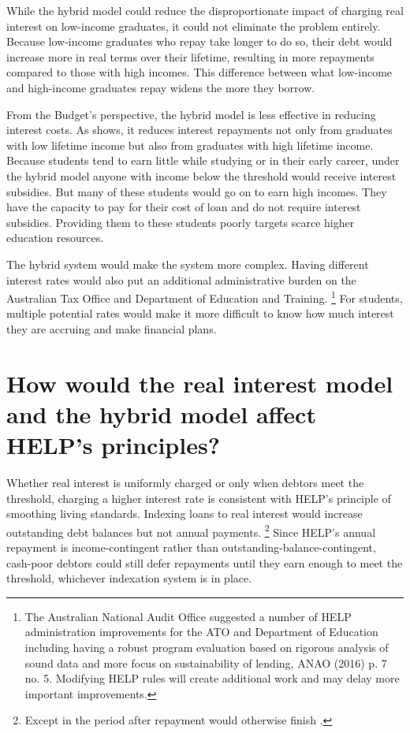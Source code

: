 \documentclass[embargoed]{grattan}
\begin{document}
While the hybrid model could reduce the disproportionate impact of charging real interest on low-income graduates, it could not eliminate the problem entirely.
Because low-income graduates who repay take longer to do so, their debt would increase more in real terms over their lifetime, resulting in more repayments compared to those with high incomes.
This difference between what low-income and high-income graduates repay widens the more they borrow.

From the Budget's perspective, the hybrid model is less effective in reducing interest costs.
As  shows, it reduces interest repayments not only from graduates with low lifetime income but also from graduates with high lifetime income.
Because students tend to earn little while studying or in their early career, under the hybrid model anyone with income below the threshold would receive interest subsidies.
But many of these students would go on to earn high incomes.
They have the capacity to pay for their cost of loan and do not require interest subsidies.
Providing them to these students poorly targets scarce higher education resources.

The hybrid system would make the system more complex.
Having different interest rates would also put an additional administrative burden on the Australian Tax Office and Department of Education and Training.%
\footnote{The Australian National Audit Office suggested a number of \gls{HELP} administration improvements for the \gls{ATO} and Department of Education including having a robust program evaluation based on rigorous analysis of sound data and more focus on sustainability of lending, ANAO (2016) p. 7 no. 5.
Modifying \gls{HELP} rules will create additional work and may delay more important improvements.} For students, multiple potential rates would make it more difficult to know how much interest they are accruing and make financial plans.

\section[How would the real interest model and the hybrid model affect {HELP}'s principles?]{How would the real interest model and the hybrid model affect \gls{HELP}'s principles?}\label{how-would-the-real-interest-model-and-the-hybrid-model-affect-helps-principles}

Whether real interest is uniformly charged or only when debtors meet the threshold, charging a higher interest rate is consistent with \gls{HELP}'s principle of smoothing living standards.
Indexing loans to real interest would increase outstanding debt balances but not annual payments.%
\footnote{Except in the period after repayment would otherwise finish .} Since \gls{HELP}'s annual repayment is income-contingent rather than outstanding-balance-contingent, cash-poor debtors could still defer repayments until they earn enough to meet the threshold, whichever indexation system is in place.
\end{document}
